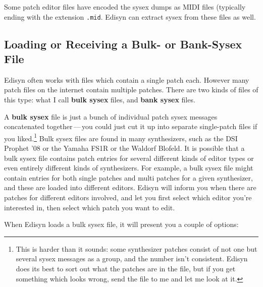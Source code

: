 \documentclass{article}
\begin{document}
Some patch editor files have encoded the sysex dumps as MIDI files (typically ending with the extension {\tt .mid}.  Edisyn can extract sysex from these files as well.

\subsection{Loading or Receiving a Bulk- or Bank-Sysex File}
Edisyn often works with files which contain a single patch each.   However many patch files on the internet contain multiple patches.  There are two kinds of files of this type: what I call {\bf bulk sysex} files, and {\bf bank sysex} files. 

A {\bf bulk sysex} file is just a bunch of individual patch sysex messages concatenated together\,---\,you could just cut it up into separate single-patch files if you liked.\footnote{This is harder than it sounds: some synthesizer patches consist of not one but several sysex messages as a group, and the number isn't consistent.  Edisyn does its best to sort out what the patches are in the file, but if you get something which looks wrong, send the file to me and let me look at it.}    Bulk sysex files are found in many synthesizers, such as the DSI Prophet '08 or the Yamaha FS1R or the Waldorf Blofeld.  It is possible that a bulk sysex file contains patch entries for several different kinds of editor types or even entirely different kinds of synthesizers.  For example, a bulk sysex file might contain entries for both single patches and multi patches for a given synthesizer, and these are loaded into different editors.  Edisyn will inform you when there are patches for different editors involved, and let you first select which editor you're interested in, then select which patch you want to edit. 

When Edisyn loads a bulk sysex file, it will present you a couple of options: 
\end{document}
